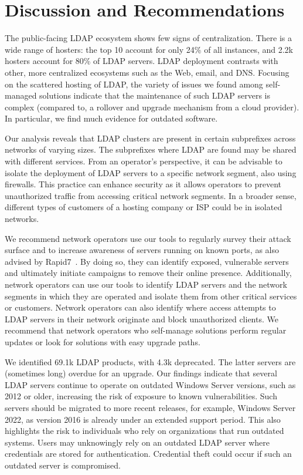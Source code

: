\section{Discussion and Recommendations}
The public-facing \gls{LDAP} ecosystem shows few signs of centralization. There is a wide range of hosters: the top 10 account for only 24\% of all instances, and 2.2k hosters account for 80\% of \gls{LDAP} servers.
\gls{LDAP} deployment contrasts with other, more centralized ecosystems such as the Web, email, and DNS. Focusing on the scattered hosting of \gls{LDAP}, the variety of issues we found among self-managed solutions indicate that the maintenance of such \gls{LDAP} servers is complex (compared to, \eg a rollover and upgrade mechanism from a cloud provider). In particular, we find much evidence for outdated software.

Our analysis reveals that \gls{LDAP} clusters are present in certain subprefixes across networks of varying sizes. The subprefixes where \gls{LDAP} are found may be shared with different services. From an operator's perspective, it can be advisable to isolate the deployment of \gls{LDAP} servers to a specific network segment, also using firewalls. This practice can enhance security as it allows operators to prevent unauthorized traffic from accessing critical network segments. In a broader sense, different types of customers of a hosting company or \gls{ISP} could be in isolated networks.

We recommend network operators use our tools to regularly survey their attack surface and to increase awareness of servers running on known ports, as also advised by Rapid7~\cite{project_sonar_rapid7}. By doing so, they can identify exposed, vulnerable servers and ultimately initiate campaigns to remove their online presence. Additionally, network operators can use our tools to identify \gls{LDAP} servers and the network segments in which they are operated and isolate them from other critical services or customers. Network operators can also identify where access attempts to \gls{LDAP} servers in their network originate and block unauthorized clients. We recommend that network operators who self-manage solutions perform regular updates or look for solutions with easy upgrade paths.

We identified 69.1k \gls{LDAP} products, with 4.3k deprecated. 
The latter servers are (sometimes long) overdue for an upgrade.
Our findings indicate that several \gls{LDAP} servers continue to operate on outdated Windows Server versions, such as 2012 or older, increasing the risk of exposure to known vulnerabilities. Such servers should be migrated to more recent releases, for example, Windows Server 2022, as version 2016 is already under an extended support period.
This also highlights the risk to individuals who rely on organizations that run outdated systems. Users may unknowingly rely on an outdated \gls{LDAP} server where credentials are stored for authentication. Credential theft could occur if such an outdated server is compromised.

